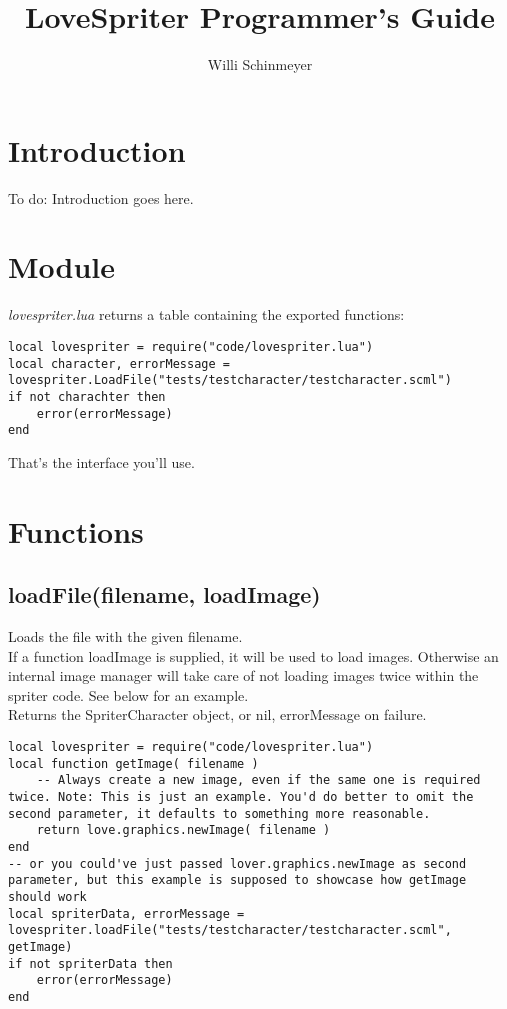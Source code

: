 \documentclass{article}
\title{LoveSpriter Programmer's Guide}
\author{Willi Schinmeyer}
\begin{document}
\maketitle

\newpage

\tableofcontents

\newpage

\section{Introduction}


To do: Introduction goes here.



\newpage

\section{Module}

{\it lovespriter.lua} returns a table containing the exported functions:
\begin{lstlisting}
local lovespriter = require("code/lovespriter.lua")
local character, errorMessage = lovespriter.LoadFile("tests/testcharacter/testcharacter.scml")
if not charachter then
	error(errorMessage)
end
\end{lstlisting}
That's the interface you'll use.



\newpage

\section{Functions}


\subsection{loadFile(filename, loadImage)}

Loads the file with the given filename.\\
If a function loadImage is supplied, it will be used to load images. Otherwise an internal image manager will take care of not loading images twice within the spriter code. See below for an example.\\
Returns the SpriterCharacter object, or nil, errorMessage on failure.
\begin{lstlisting}
local lovespriter = require("code/lovespriter.lua")
local function getImage( filename )
	-- Always create a new image, even if the same one is required twice. Note: This is just an example. You'd do better to omit the second parameter, it defaults to something more reasonable.
	return love.graphics.newImage( filename )
end
-- or you could've just passed lover.graphics.newImage as second parameter, but this example is supposed to showcase how getImage should work
local spriterData, errorMessage = lovespriter.loadFile("tests/testcharacter/testcharacter.scml", getImage)
if not spriterData then
	error(errorMessage)
end
\end{lstlisting}
\end{document}
